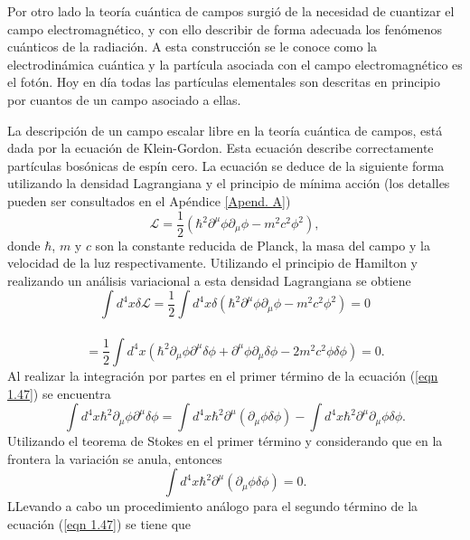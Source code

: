 \documentclass[a4paper,openright,10pt, oneside, final]{book}
\begin{document}
Por otro lado la teoría cuántica de campos surgió de la necesidad de cuantizar el campo electromagnético, y con ello describir de forma adecuada los fenómenos cuánticos de la radiación. A esta construcción se le conoce como la electrodinámica cuántica y la partícula asociada con el campo electromagnético es el fotón. Hoy en día todas las partículas elementales son descritas en principio por cuantos de un campo asociado a ellas.

La descripción de un campo escalar libre en la teoría cuántica de campos, está dada por la ecuación de Klein-Gordon. Esta ecuación describe correctamente partículas bosónicas de espín cero. La ecuación se deduce de la siguiente forma utilizando la densidad Lagrangiana y el principio de mínima acción (los detalles pueden ser consultados en el Apéndice \ref{Apend. A})
\begin{equation}
\mathcal{L} = \frac{1}{2}(\hbar^{2}\partial^{\mu}\phi\partial_{\mu}\phi -m^{2}c^{2}\phi^{2}),\label{eqn 1.46}
\end{equation}
donde $\hbar$, $m$ y $c$ son la constante reducida de Planck, la masa del campo y la velocidad de la luz respectivamente. Utilizando el principio de Hamilton y realizando un análisis variacional a esta densidad Lagrangiana se obtiene
\begin{equation*}
\int d^{4}x\delta\mathcal{L}
=
\frac{1}{2} \int d^{4}x\delta(\hbar^{2}\partial^{\mu}\phi\partial_{\mu}\phi -m^{2}c^{2}\phi^{2}) = 0
\end{equation*}\
\begin{equation}
= \frac{1}{2}\int d^{4}x(\hbar^{2}\partial_{\mu}\phi\partial^{\mu}\delta\phi 
+ \partial^{\mu}\phi\partial_{\mu}\delta\phi 
-2m^{2}c^{2}\phi\delta\phi)
= 0.
\label{eqn 1.47}
\end{equation}
Al realizar la integración por partes en el primer término de la ecuación (\ref{eqn 1.47}) se encuentra
\begin{equation}
\int d^{4}x\hbar^{2}\partial_{\mu}\phi\partial^{\mu}\delta\phi 
=
\int d^{4}x\hbar^{2}\partial^{\mu}(\partial_{\mu}\phi\delta\phi)
-
\int d^{4}x\hbar^{2}\partial^{\mu}\partial_{\mu}\phi\delta\phi.\label{eqn 1.48}
\end{equation}
Utilizando el teorema de Stokes en el primer término y considerando que en la frontera la variación se anula, entonces
\begin{equation}
\int d^{4}x\hbar^{2}\partial^{\mu}(\partial_{\mu}\phi\delta\phi)=0.\label{eqn 1.49}
\end{equation}
LLevando a cabo un procedimiento análogo para el segundo término de la ecuación (\ref{eqn 1.47}) se tiene que
\end{document}
